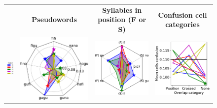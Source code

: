 \hspace{-5ex}
\begin{figure}[ht]
\scriptsize
\hspace{0ex}
\begin{tabular}{lccc}
{} & \textbf{\Large Pseudowords} & \textbf{\Large Syllables in position (F or S)} & \textbf{\Large Confusion cell categories}\\
\vspace{2ex}
\hspace{0ex}
{\includegraphics[width=.07\linewidth]{figures/part_II/subjects_legend.pdf}}
\hspace{-3ex}
&{\includegraphics[width=.3\linewidth]{figures/part_II/roi_plots/auditory/radial_word.pdf}}
\hspace{-3ex}
&{\includegraphics[width=.3\linewidth]{figures/part_II/roi_plots/auditory/radial_joint.pdf}}
\hspace{-3ex}
&{\includegraphics[width=.3\linewidth]{figures/part_II/roi_plots/auditory/super_tests.pdf}}
\hspace{0ex}
\\

\end{tabular}
\end{figure}
